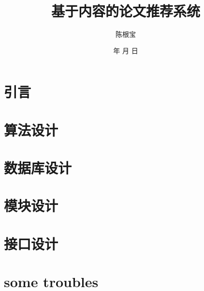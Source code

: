\documentclass[a4paper]{article}
\begin{document}
\renewcommand{\today}{\number\year 年 \number\month 月 \number\day 日}
\renewcommand{\contentsname}{目 \quad 录}
\title{基于内容的论文推荐系统}
\author{陈根宝}
\date{\today}
\maketitle
\newpage
\tableofcontents
\newpage
\section{引言}
\section{算法设计}
\section{数据库设计}
\section{模块设计}
\section{接口设计}
\section{some troubles}
\end{document}
